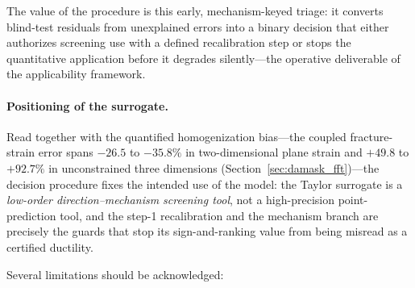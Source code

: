 The value of the procedure is this early, mechanism-keyed triage: it converts blind-test residuals from unexplained errors into a binary decision that either authorizes screening use with a defined recalibration step or stops the quantitative application before it degrades silently---the operative deliverable of the applicability framework.

\paragraph{Positioning of the surrogate.} Read together with the quantified homogenization bias---the coupled fracture-strain error spans $-26.5$ to $-35.8\%$ in two-dimensional plane strain and $+49.8$ to $+92.7\%$ in unconstrained three dimensions (Section~\ref{sec:damask_fft})---the decision procedure fixes the intended use of the model: the Taylor surrogate is a \emph{low-order direction--mechanism screening tool}, not a high-precision point-prediction tool, and the step-1 recalibration and the mechanism branch are precisely the guards that stop its sign-and-ranking value from being misread as a certified ductility.

Several limitations should be acknowledged:

